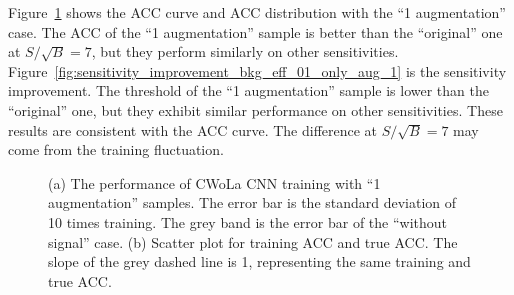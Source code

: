 \documentclass[12pt]{article}
\begin{document}
        Figure~\ref{fig:cwola_cnn_training_performance_only_aug_1} shows the ACC curve and ACC distribution with the ``1 augmentation'' case. The ACC of the ``1 augmentation'' sample is better than the ``original'' one at $S / \sqrt{B}=7$, but they perform similarly on other sensitivities. Figure~\ref{fig:sensitivity_improvement_bkg_eff_01_only_aug_1} is the sensitivity improvement. The threshold of the ``1 augmentation'' sample is lower than the ``original'' one, but they exhibit similar performance on other sensitivities. These results are consistent with the ACC curve. The difference at $S / \sqrt{B}=7$ may come from the training fluctuation.
        \begin{figure}[htpb]
            \centering
            \caption{(a) The performance of CWoLa CNN training with ``1 augmentation'' samples. The error bar is the standard deviation of 10 times training. The grey band is the error bar of the ``without signal'' case. (b) Scatter plot for training ACC and true ACC. The slope of the grey dashed line is 1, representing the same training and true ACC.}
            \label{fig:cwola_cnn_training_performance_only_aug_1}
        \end{figure}
\end{document}

